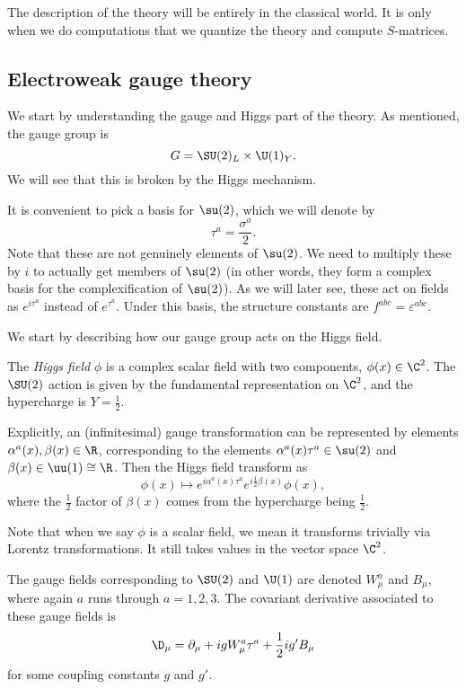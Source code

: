 \documentclass[a4paper]{article}
\begin{document}
The description of the theory will be entirely in the classical world. It is only when we do computations that we quantize the theory and compute $S$-matrices.

\subsection{Electroweak gauge theory}
We start by understanding the gauge and Higgs part of the theory. As mentioned, the gauge group is
\[
  G = \SU(2)_L \times \U(1)_Y.
\]
We will see that this is broken by the Higgs mechanism.

It is convenient to pick a basis for $\su(2)$, which we will denote by
\[
  \tau^a = \frac{\sigma^a}{2}.
\]
Note that these are not genuinely elements of $\su(2)$. We need to multiply these by $i$ to actually get members of $\su(2)$ (in other words, they form a complex basis for the complexification of $\su(2)$). As we will later see, these act on fields as $e^{i \tau^a}$ instead of $e^{\tau^a}$. Under this basis, the structure constants are $f^{abc} = \varepsilon^{abc}$.

We start by describing how our gauge group acts on the Higgs field.
\begin{defi}
  The \emph{Higgs field} $\phi$ is a complex scalar field with two components, $\phi(x) \in \C^2$. The $\SU(2)$ action is given by the fundamental representation on $\C^2$, and the hypercharge is $Y = \frac{1}{2}$.

  Explicitly, an (infinitesimal) gauge transformation can be represented by elements $\alpha^a(x), \beta(x) \in \R$, corresponding to the elements $\alpha^a(x) \tau^a \in \su(2)$ and $\beta(x) \in \uu (1) \cong \R$. Then the Higgs field transform as
  \[
    \phi(x) \mapsto e^{i \alpha^a(x) \tau^a} e^{i \frac{1}{2} \beta(x)} \phi(x),
  \]
  where the $\frac{1}{2}$ factor of $\beta(x)$ comes from the hypercharge being $\frac{1}{2}$.
\end{defi}
Note that when we say $\phi$ is a scalar field, we mean it transforms trivially via Lorentz transformations. It still takes values in the vector space $\C^2$.

The gauge fields corresponding to $\SU(2)$ and $\U(1)$ are denoted $W_\mu^a$ and $B_\mu$, where again $a$ runs through $a = 1, 2, 3$. The covariant derivative associated to these gauge fields is
\[
  \D_\mu = \partial_\mu + i g W_\mu^a \tau^a + \frac{1}{2} i g' B_\mu
\]
for some coupling constants $g$ and $g'$.
\end{document}
